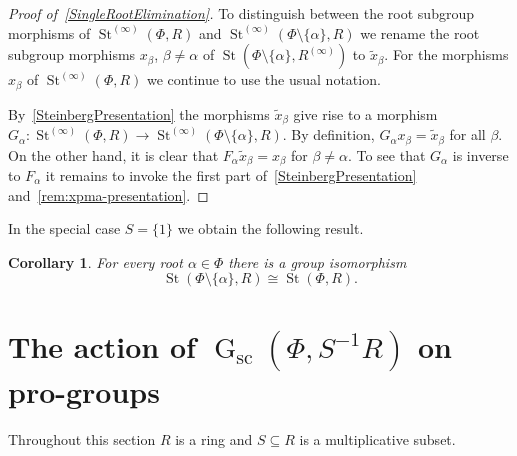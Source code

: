 \documentclass[oneside, 11pt]{amsart}
\numberwithin{equation}{section}
\newtheorem{corollary}[lemma]{Corollary}
\theoremstyle{definition}
\theoremstyle{remark}
\DeclareMathOperator\St{St}
\DeclareMathOperator\GG{G}
\begin{document}
\begin{proof}[Proof of~\cref{SingleRootElimination}]
To distinguish between the root subgroup morphisms of $\St^{(\infty)}(\Phi, R)$ and $\St^{(\infty)}(\Phi\setminus\{\alpha\}, R)$ we rename the root subgroup morphisms $x_\beta$, $\beta\neq \alpha$ of $\St(\Phi\setminus\{\alpha\}, R^{(\infty)})$ to $\widetilde{x}_{\beta}$. For the morphisms $x_\beta$ of $\St^{(\infty)}(\Phi, R)$ we continue to use the usual notation. 

By~\cref{SteinbergPresentation} the morphisms $\widetilde{x}_{\beta}$ give rise to a morphism $G_\alpha \colon \St^{(\infty)}(\Phi, R) \to \St^{(\infty)}(\Phi\setminus\{\alpha\}, R)$. By definition, $G_\alpha x_\beta = \widetilde{x}_\beta$ for all $\beta$. On the other hand, it is clear that $F_\alpha \widetilde{x}_\beta = x_\beta$ for $\beta\neq \alpha$. To see that $G_\alpha$ is inverse to $F_\alpha$ it remains to invoke the first part of~\cref{SteinbergPresentation} and~\cref{rem:xpma-presentation}.
\end{proof}

In the special case $S = \{1\}$ we obtain the following result.
\begin{corollary}  For every root \(\alpha \in \Phi\) there is a group isomorphism \[\St(\Phi\setminus\{ \alpha\}, R) \cong \St(\Phi, R).\] \end{corollary}

\section{The action of \texorpdfstring{$\GG_{\mathrm{sc}}(\Phi, S^{-1}R)$}{G(Ф, R)} on pro-groups} \label{sec:local-action}
Throughout this section \(R\) is a ring and \(S \subseteq R\) is a multiplicative subset.
\end{document}
